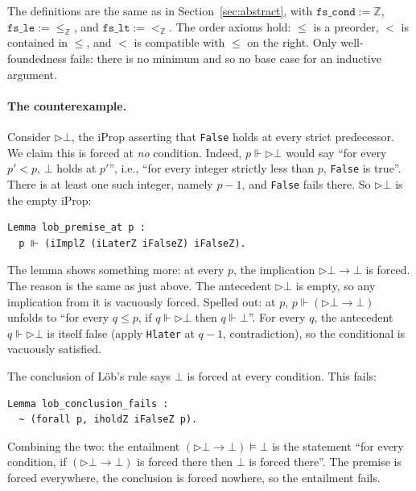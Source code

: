 \noindent
The definitions are the same as in Section~\ref{sec:abstract}, with
$\mathtt{fs\_cond} := \mathbb{Z}$, $\mathtt{fs\_le} := \le_\mathbb{Z}$,
and $\mathtt{fs\_lt} := <_\mathbb{Z}$.  The order axioms hold: $\le$
is a preorder, $<$ is contained in $\le$, and $<$ is compatible with
$\le$ on the right.  Only well-foundedness fails: there is no
minimum and so no base case for an inductive argument.

\paragraph{The counterexample.}
Consider $\triangleright \bot$, the iProp asserting that
\texttt{False} holds at every strict predecessor.  We claim this is
forced at \emph{no} condition.  Indeed, $p \Vdash \triangleright \bot$
would say ``for every $p' < p$, $\bot$ holds at $p'$'', i.e., ``for
every integer strictly less than $p$, \texttt{False} is true''.
There is at least one such integer, namely $p - 1$, and
\texttt{False} fails there.  So $\triangleright \bot$ is the empty
iProp:

\begin{lstlisting}
Lemma lob_premise_at p :
  p ⊩ (iImplZ (iLaterZ iFalseZ) iFalseZ).
\end{lstlisting}

\noindent
The lemma shows something more: at every $p$, the
implication $\triangleright \bot \to \bot$ is forced.  The reason is
the same as just above.  The antecedent $\triangleright \bot$ is
empty, so any implication from it is vacuously forced.  Spelled out:
at $p$, $p \Vdash (\triangleright \bot \to \bot)$ unfolds to ``for
every $q \le p$, if $q \Vdash \triangleright \bot$ then $q \Vdash
\bot$''. For every $q$, the antecedent $q \Vdash \triangleright \bot$
is itself false (apply \texttt{Hlater} at $q - 1$, contradiction), so
the conditional is vacuously satisfied.

The conclusion of Löb's rule says $\bot$ is forced at every
condition.  This fails:

\begin{lstlisting}
Lemma lob_conclusion_fails :
  ~ (forall p, iholdZ iFalseZ p).
\end{lstlisting}

\noindent
Combining the two: the entailment $(\triangleright \bot \to \bot)
\vDash \bot$ is the statement ``for every condition, if
$(\triangleright \bot \to \bot)$ is forced there then $\bot$ is forced
there''. The premise is forced everywhere, the conclusion is forced
nowhere, so the entailment fails.

